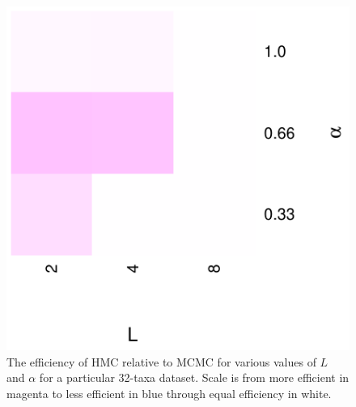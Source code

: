 \documentclass{article}
\begin{document}
    \begin{figure}
        \centering
        \includegraphics[scale=0.8]{heatmap.pdf}
        \caption{The efficiency of \ac{HMC} relative to \ac{MCMC} for various
                 values of $L$ and $\alpha$ for a particular 32-taxa dataset.
                 Scale is from more efficient in magenta to less efficient in
                 blue through equal efficiency in white.}
    \end{figure}

    \printbibliography
\end{document}
